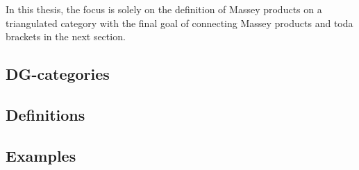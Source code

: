 In this thesis, the focus is solely on the definition of Massey products on a triangulated category with the final goal of connecting Massey products and toda brackets in the next section.

\subsection{DG-categories}


\subsection{Definitions}


\subsection{Examples}
